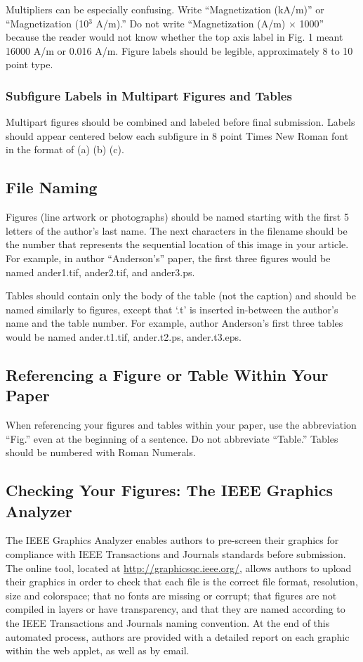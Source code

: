 \documentclass[journal]{IEEEtran}
\begin{document}
Multipliers can be especially confusing. Write ``Magnetization (kA/m)'' or 
``Magnetization (10$^{3}$ A/m).'' Do not write ``Magnetization 
(A/m)$\,\times\,$1000'' because the reader would not know whether the top 
axis label in Fig. 1 meant 16000 A/m or 0.016 A/m. Figure labels should be 
legible, approximately 8 to 10 point type.

\subsubsection{Subfigure Labels in Multipart Figures and Tables}
Multipart figures should be combined and labeled before final submission. 
Labels should appear centered below each subfigure in 8 point Times New 
Roman font in the format of (a) (b) (c). 

\subsection{File Naming}
Figures (line artwork or photographs) should be named starting with the 
first 5 letters of the author's last name. The next characters in the 
filename should be the number that represents the sequential 
location of this image in your article. For example, in author 
``Anderson's'' paper, the first three figures would be named ander1.tif, 
ander2.tif, and ander3.ps.

Tables should contain only the body of the table (not the caption) and 
should be named similarly to figures, except that `.t' is inserted 
in-between the author's name and the table number. For example, author 
Anderson's first three tables would be named ander.t1.tif, ander.t2.ps, 
ander.t3.eps.

\subsection{Referencing a Figure or Table Within Your Paper}
When referencing your figures and tables within your paper, use the 
abbreviation ``Fig.'' even at the beginning of a sentence. Do not abbreviate 
``Table.'' Tables should be numbered with Roman Numerals.

\subsection{Checking Your Figures: The IEEE Graphics Analyzer}
The IEEE Graphics Analyzer enables authors to pre-screen their graphics for 
compliance with IEEE Transactions and Journals standards before submission. 
The online tool, located at
\underline{http://graphicsqc.ieee.org/}, allows authors to 
upload their graphics in order to check that each file is the correct file 
format, resolution, size and colorspace; that no fonts are missing or 
corrupt; that figures are not compiled in layers or have transparency, and 
that they are named according to the IEEE Transactions and Journals naming 
convention. At the end of this automated process, authors are provided with 
a detailed report on each graphic within the web applet, as well as by 
email.
\end{document}

